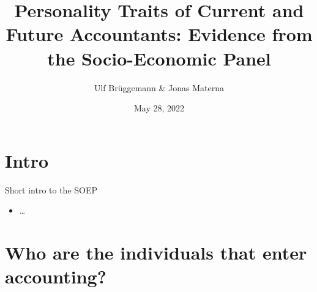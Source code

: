 \documentclass[
  9pt,
  ignorenonframetext,
]{beamer}
\title{Personality Traits of Current and Future Accountants: Evidence
from the Socio-Economic Panel}
\author{Ulf Brüggemann \& Jonas Materna}
\date{May 28, 2022}
\institute{TRR 266 Accounting for Transparency}
\providecommand{\tightlist}{%
  \setlength{\itemsep}{0pt}\setlength{\parskip}{0pt}}
\begin{document}
\frame{\titlepage}

\hypertarget{intro}{%
\section{Intro}\label{intro}}

\begin{frame}{Short intro to the SOEP}
\protect\hypertarget{short-intro-to-the-soep}{}
\begin{itemize}
\tightlist
\item
  \ldots{}
\end{itemize}
\end{frame}

\hypertarget{who-are-the-individuals-that-enter-accounting}{%
\section{Who are the individuals that enter
accounting?}\label{who-are-the-individuals-that-enter-accounting}}
\end{document}
